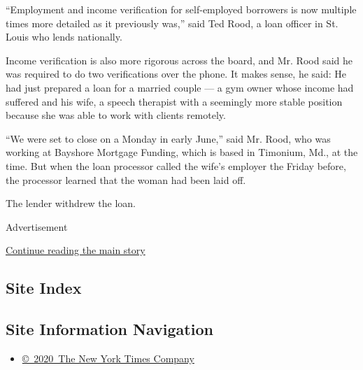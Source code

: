 ``Employment and income verification for self-employed borrowers is now
multiple times more detailed as it previously was,'' said Ted Rood, a
loan officer in St. Louis who lends nationally.

Income verification is also more rigorous across the board, and Mr. Rood
said he was required to do two verifications over the phone. It makes
sense, he said: He had just prepared a loan for a married couple --- a
gym owner whose income had suffered and his wife, a speech therapist
with a seemingly more stable position because she was able to work with
clients remotely.

``We were set to close on a Monday in early June,'' said Mr. Rood, who
was working at Bayshore Mortgage Funding, which is based in Timonium,
Md., at the time. But when the loan processor called the wife's employer
the Friday before, the processor learned that the woman had been laid
off.

The lender withdrew the loan.

Advertisement

\protect\hyperlink{after-bottom}{Continue reading the main story}

\hypertarget{site-index}{%
\subsection{Site Index}\label{site-index}}

\hypertarget{site-information-navigation}{%
\subsection{Site Information
Navigation}\label{site-information-navigation}}

\begin{itemize}
\tightlist
\item
  \href{https://help.nytimes3xbfgragh.onion/hc/en-us/articles/115014792127-Copyright-notice}{©~2020~The
  New York Times Company}
\end{itemize}

